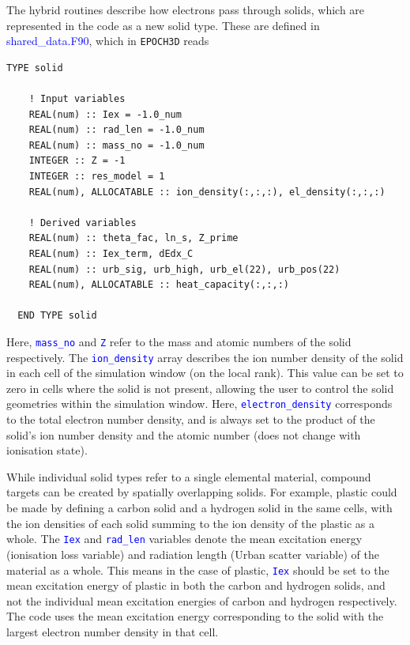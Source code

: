 \documentclass[12pt]{article}
\numberwithin{equation}{section}
\begin{document}
The hybrid routines describe how electrons pass through solids, which are represented in the code as a new solid type. These are defined in \textcolor{blue}{shared\_data.F90}, which in \texttt{EPOCH3D} reads

\begin{lstlisting}[style=myInputDeck]
  TYPE solid
  
    ! Input variables
    REAL(num) :: Iex = -1.0_num
    REAL(num) :: rad_len = -1.0_num
    REAL(num) :: mass_no = -1.0_num
    INTEGER :: Z = -1
    INTEGER :: res_model = 1
    REAL(num), ALLOCATABLE :: ion_density(:,:,:), el_density(:,:,:)

    ! Derived variables
    REAL(num) :: theta_fac, ln_s, Z_prime
    REAL(num) :: Iex_term, dEdx_C
    REAL(num) :: urb_sig, urb_high, urb_el(22), urb_pos(22)
    REAL(num), ALLOCATABLE :: heat_capacity(:,:,:)
    
  END TYPE solid
\end{lstlisting}

Here, \textcolor{blue}{\texttt{mass\_no}} and \textcolor{blue}{\texttt{Z}} refer to the mass and atomic numbers of the solid respectively. The \textcolor{blue}{\texttt{ion\_density}} array describes the ion number density of the solid in each cell of the simulation window (on the local rank). This value can be set to zero in cells where the solid is not present, allowing the user to control the solid geometries within the simulation window. Here, \textcolor{blue}{\texttt{electron\_density}} corresponds to the total electron number density, and is always set to the product of the solid's ion number density and the atomic number (does not change with ionisation state).

While individual solid types refer to a single elemental material, compound targets can be created by spatially overlapping solids. For example, plastic could be made by defining a carbon solid and a hydrogen solid in the same cells, with the ion densities of each solid summing to the ion density of the plastic as a whole. The \textcolor{blue}{\texttt{Iex}} and \textcolor{blue}{\texttt{rad\_len}} variables denote the mean excitation energy (ionisation loss variable) and radiation length (Urban scatter variable) of the material as a whole. This means in the case of plastic, \textcolor{blue}{\texttt{Iex}} should be set to the mean excitation energy of plastic in both the carbon and hydrogen solids, and not the individual mean excitation energies of carbon and hydrogen respectively. The code uses the mean excitation energy corresponding to the solid with the largest electron number density in that cell.
\end{document}
